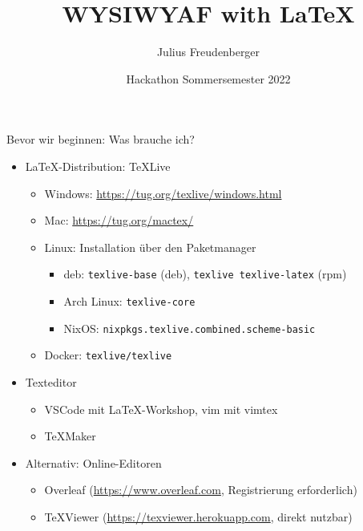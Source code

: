 \documentclass[presentation,aspectratio=169]{beamer}
\author{Julius Freudenberger}
\date{Hackathon Sommersemester 2022}
\title{WYSIWYAF with \LaTeX}
\institute[Hochschule Esslingen]{Hochschule Esslingen}
\begin{document}
\maketitle

\begin{frame}[fragile]{Bevor wir beginnen: Was brauche ich?}
  \begin{itemize}
    \item \LaTeX-Distribution: \TeX{}Live
      \begin{itemize}
        \item Windows: \href{https://tug.org/texlive/windows.html}{https://tug.org/texlive/windows.html} %
        \item Mac: \href{https://tug.org/mactex/}{https://tug.org/mactex/}
        \item Linux: Installation über den Paketmanager
          \begin{itemize}
            \item deb: \verb|texlive-base| (deb), \verb|texlive texlive-latex| (rpm)
            \item Arch Linux: \verb|texlive-core|
            \item NixOS: \verb|nixpkgs.texlive.combined.scheme-basic|
          \end{itemize}
        \item Docker: \verb|texlive/texlive|
      \end{itemize}
    \item Texteditor
      \begin{itemize}
        \item VSCode mit \LaTeX-Workshop, vim mit vimtex
        \item \TeX{}Maker
      \end{itemize}
    \item Alternativ: Online-Editoren
      \begin{itemize}
        \item Overleaf (\href{https://www.overleaf.com}{https://www.overleaf.com}, Registrierung erforderlich)
        \item \TeX{}Viewer (\href{https://texviewer.herokuapp.com}{https://texviewer.herokuapp.com}, direkt nutzbar)
      \end{itemize}
  \end{itemize}
\end{frame}
\end{document}
